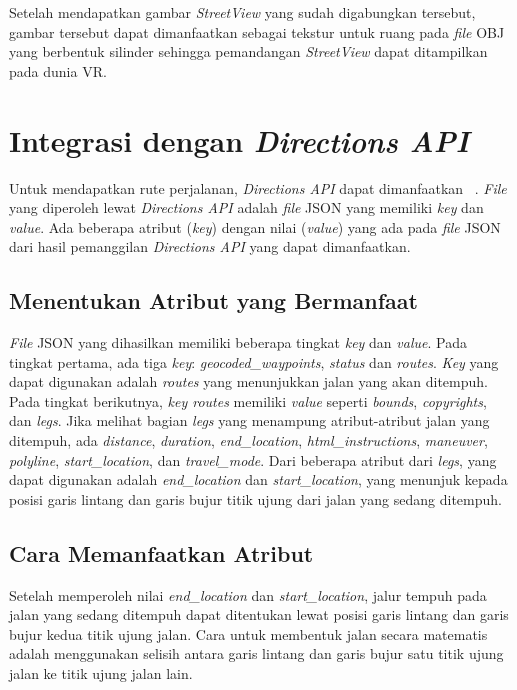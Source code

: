 Setelah mendapatkan gambar \textit{StreetView} yang sudah digabungkan tersebut, gambar tersebut dapat dimanfaatkan sebagai tekstur untuk ruang pada \textit{file} OBJ yang berbentuk silinder sehingga pemandangan \textit{StreetView} dapat ditampilkan pada dunia VR.

\section{Integrasi dengan \textit{Directions API}}
Untuk mendapatkan rute perjalanan, \textit{Directions API} dapat dimanfaatkan ~\cite{directions-api}. \textit{File} yang diperoleh lewat \textit{Directions API} adalah \textit{file} JSON yang memiliki \textit{key} dan \textit{value}. Ada beberapa atribut (\textit{key}) dengan nilai (\textit{value}) yang ada pada \textit{file} JSON dari hasil pemanggilan \textit{Directions API} yang dapat dimanfaatkan.

\subsection{Menentukan Atribut yang Bermanfaat}
\textit{File} JSON yang dihasilkan memiliki beberapa tingkat \textit{key} dan \textit{value}. Pada tingkat pertama, ada tiga \textit{key}: \textit{geocoded\_waypoints}, \textit{status} dan \textit{routes}. \textit{Key} yang dapat digunakan adalah \textit{routes} yang menunjukkan jalan yang akan ditempuh. Pada tingkat berikutnya, \textit{key routes} memiliki \textit{value} seperti \textit{bounds}, \textit{copyrights}, dan \textit{legs}. Jika melihat bagian \textit{legs} yang menampung atribut-atribut jalan yang ditempuh, ada {\it distance}, {\it duration}, {\it end\_location}, {\it html\_instructions}, {\it maneuver}, {\it polyline}, {\it start\_location}, dan \textit{travel\_mode}. Dari beberapa atribut dari \textit{legs}, yang dapat digunakan adalah \textit{end\_location} dan \textit{start\_location}, yang menunjuk kepada posisi garis lintang dan garis bujur titik ujung dari jalan yang sedang ditempuh. 

\subsection{Cara Memanfaatkan Atribut}
\label{subs:directions-attr-use}
Setelah memperoleh nilai \textit{end\_location} dan \textit{start\_location}, jalur tempuh pada jalan yang sedang ditempuh dapat ditentukan lewat posisi garis lintang dan garis bujur kedua titik ujung jalan. Cara untuk membentuk jalan secara matematis adalah menggunakan selisih antara garis lintang dan garis bujur satu titik ujung jalan ke titik ujung jalan lain. 

